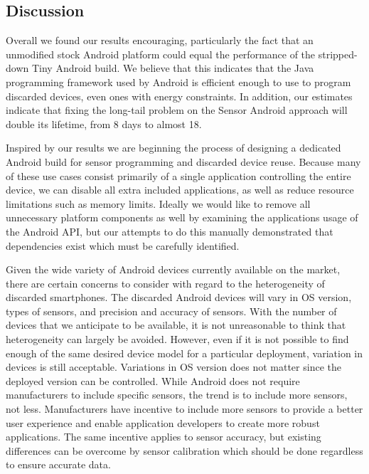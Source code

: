 \subsection{Discussion}

Overall we found our results encouraging, particularly the fact that an
unmodified stock Android platform could equal the performance of the
stripped-down Tiny Android build. We believe that this indicates that the
Java programming framework used by Android is efficient enough to use to
program discarded devices, even ones with energy constraints. In addition,
our estimates indicate that fixing the long-tail problem on the Sensor
Android approach will double its lifetime, from 8 days to almost 18.

Inspired by our results we are beginning the process of designing a dedicated
Android build for sensor programming and discarded device reuse. Because many
of these use cases consist primarily of a single application controlling the
entire device, we can disable all extra included applications, as well as
reduce resource limitations such as memory limits. Ideally we would like to
remove all unnecessary platform components as well by examining the
applications usage of the Android API, but our attempts to do this manually
demonstrated that dependencies exist which must be carefully identified.

Given the wide variety of Android devices currently available on the market,
there are certain concerns to consider with regard to the heterogeneity of
discarded smartphones.  The discarded Android devices will vary in OS version,
types of sensors, and precision and accuracy of sensors.
With the number of devices that we anticipate to be available, it is not
unreasonable to think that heterogeneity can largely be avoided.  However,
even if it is not possible to find enough of the same desired device model for
a particular deployment,  variation in devices is still acceptable.  Variations
in OS version does not matter since the deployed version can be controlled.
While Android does not require manufacturers to include specific sensors,
the trend is to include more sensors, not less.  Manufacturers have incentive to
include more sensors to provide a better user experience and enable application
developers to create more robust applications.  The same incentive applies to
sensor accuracy, but existing differences can be overcome by sensor calibration
which should be done regardless to ensure accurate data.
